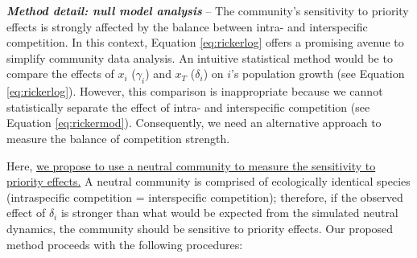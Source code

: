 \documentclass[12pt, class=article, crop=false]{standalone}
\begin{document}
\textbf{\textit{Method detail: null model analysis}} --
The community's sensitivity to priority effects is strongly affected by the balance between intra- and interspecific competition.
In this context, Equation \ref{eq:rickerlog} offers a promising avenue to simplify community data analysis. 
An intuitive statistical method would be to compare the effects of $x_i$ ($\gamma_i$) and $x_T$ ($\delta_i$) on $i$'s population growth (see Equation \ref{eq:rickerlog}).
However, this comparison is inappropriate because we cannot statistically separate the effect of intra- and interspecific competition (see Equation \ref{eq:rickermod}).
Consequently, we need an alternative approach to measure the balance of competition strength.

Here, \ul{we propose to use a neutral community to measure the sensitivity to priority effects.} 
A neutral community is comprised of ecologically identical species (intraspecific competition = interspecific competition); therefore, if the observed effect of $\delta_i$ is stronger than what would be expected from the simulated neutral dynamics, the community should be sensitive to priority effects. Our proposed method proceeds with the following procedures:
\end{document}
